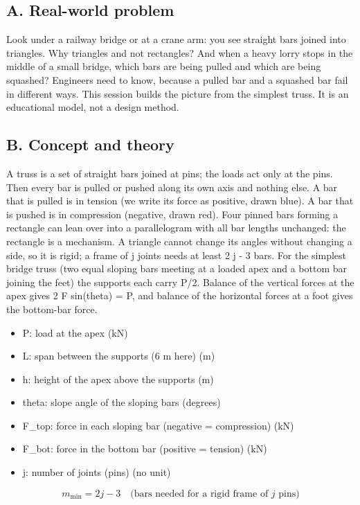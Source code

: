 \documentclass[11pt,a4paper]{article}
\begin{document}
\subsection*{A. Real-world problem}
Look under a railway bridge or at a crane arm: you see straight bars joined into triangles. Why triangles and not rectangles? And when a heavy lorry stops in the middle of a small bridge, which bars are being pulled and which are being squashed? Engineers need to know, because a pulled bar and a squashed bar fail in different ways. This session builds the picture from the simplest truss. It is an educational model, not a design method.

\subsection*{B. Concept and theory}
A truss is a set of straight bars joined at pins; the loads act only at the pins. Then every bar is pulled or pushed along its own axis and nothing else. A bar that is pulled is in tension (we write its force as positive, drawn blue). A bar that is pushed is in compression (negative, drawn red). Four pinned bars forming a rectangle can lean over into a parallelogram with all bar lengths unchanged: the rectangle is a mechanism. A triangle cannot change its angles without changing a side, so it is rigid; a frame of j joints needs at least 2 j - 3 bars. For the simplest bridge truss (two equal sloping bars meeting at a loaded apex and a bottom bar joining the feet) the supports each carry P/2. Balance of the vertical forces at the apex gives 2 F sin(theta) = P, and balance of the horizontal forces at a foot gives the bottom-bar force.

\begin{itemize}[nosep]
\item P: load at the apex (kN)
\item L: span between the supports (6 m here) (m)
\item h: height of the apex above the supports (m)
\item theta: slope angle of the sloping bars (degrees)
\item F\_top: force in each sloping bar (negative = compression) (kN)
\item F\_bot: force in the bottom bar (positive = tension) (kN)
\item j: number of joints (pins) (no unit)
\end{itemize}

\begin{equation*}
m_{\min}=2j-3\quad\text{(bars needed for a rigid frame of } j \text{ pins)}
\end{equation*}
\end{document}
